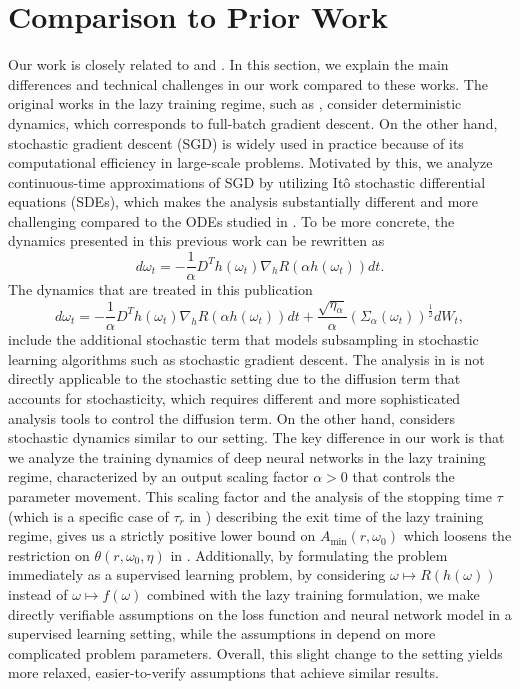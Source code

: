 \documentclass[10pt]{article} %
\begin{document}
\section{Comparison to Prior Work}\label{appendix:comparison}
Our work is closely related to \cite{lugosi2024convergencecontinuoustimestochasticgradient} and \cite{ChizatBachlazyTraining}. In this section, we explain the main differences and technical challenges in our work compared to these works. The original works in the lazy training regime, such as \cite{ChizatBachlazyTraining, du2018gradient}, consider deterministic dynamics, which corresponds to full-batch gradient descent. On the other hand, stochastic gradient descent (SGD) is widely used in practice because of its computational efficiency in large-scale problems. Motivated by this, we analyze continuous-time approximations of SGD by utilizing It\^{o} stochastic differential equations (SDEs), which makes the analysis substantially different and more challenging compared to the ODEs studied in \cite{ChizatBachlazyTraining}. To be more concrete, the dynamics presented in this previous work can be rewritten as 
$$d\omega_t=-\frac{1}{\alpha}D^Th(\omega_t)\nabla_h R(\alpha h(\omega_t))dt.$$
The dynamics that are treated in this publication 
$$d\omega_t=-\frac{1}{\alpha}D^Th(\omega_t)\nabla_h R(\alpha h(\omega_t))dt+\frac{\sqrt{\eta_\alpha}}{\alpha}(\Sigma_\alpha(\omega_t))^{\frac{1}{2}}dW_t,$$
include the additional stochastic term that models subsampling in stochastic learning algorithms such as stochastic gradient descent. The analysis in \cite{ChizatBachlazyTraining} is not directly applicable to the stochastic setting due to the diffusion term that accounts for stochasticity, which requires different and more sophisticated analysis tools to control the diffusion term.
On the other hand, \cite{lugosi2024convergencecontinuoustimestochasticgradient} considers stochastic dynamics similar to our setting. The key difference in our work is that we analyze the training dynamics of deep neural networks in the lazy training regime, characterized by an output scaling factor $\alpha > 0$ that controls the parameter movement. This scaling factor and the analysis of the stopping time $\tau$ (which is a specific case of $\tau_r$ in \cite{lugosi2024convergencecontinuoustimestochasticgradient}) describing the exit time of the lazy training regime, gives us a strictly positive lower bound on $A_{\mathrm{min}}(r,\omega_0)$ which loosens the restriction on $\theta(r,\omega_0,\eta)$ in \cite{lugosi2024convergencecontinuoustimestochasticgradient}. Additionally, by formulating the problem immediately as a supervised learning problem, by considering $\omega\mapsto R(h(\omega))$ instead of $\omega\mapsto f(\omega)$ combined with the lazy training formulation, we make directly verifiable assumptions on the loss function and neural network model in a supervised learning setting, while the assumptions in \cite{lugosi2024convergencecontinuoustimestochasticgradient} depend on more complicated problem parameters. Overall, this slight change to the setting yields more relaxed, easier-to-verify assumptions that achieve similar results.
\end{document}
